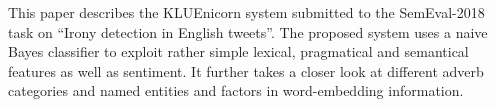 This paper describes the KLUEnicorn system submitted to the SemEval-2018 task on ``Irony detection in English tweets''. The proposed system uses a naive Bayes classifier to exploit rather simple lexical, pragmatical and semantical features as well as sentiment. It further takes a closer look at different adverb categories and named entities and factors in word-embedding information.

